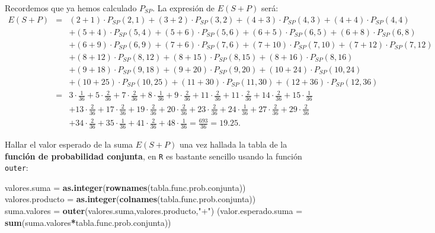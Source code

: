 \documentclass[]{book}
\newenvironment{Shaded}{\begin{snugshade}}{\end{snugshade}}
\newcommand{\DataTypeTok}[1]{\textcolor[rgb]{0.13,0.29,0.53}{#1}}
\newcommand{\KeywordTok}[1]{\textcolor[rgb]{0.13,0.29,0.53}{\textbf{#1}}}
\newcommand{\NormalTok}[1]{#1}
\newcommand{\OperatorTok}[1]{\textcolor[rgb]{0.81,0.36,0.00}{\textbf{#1}}}
\newcommand{\StringTok}[1]{\textcolor[rgb]{0.31,0.60,0.02}{#1}}
\begin{document}
Recordemos que ya hemos calculado \(P_{SP}\). La expresión de \(E(S+P)\) será:
\[
\begin{array}{rll}
E(S+P) & = &(2+1)\cdot P_{SP}(2,1)+(3+2)\cdot P_{SP}(3,2)+(4+3)\cdot P_{SP}(4,3)+(4+4)\cdot P_{SP}(4,4)\\ & &
+ (5+4)\cdot P_{SP}(5,4)+(5+6)\cdot P_{SP}(5,6)+(6+5)\cdot P_{SP}(6,5)+(6+8)\cdot P_{SP}(6,8)\\ & & 
+ (6+9)\cdot P_{SP}(6,9)+(7+6)\cdot P_{SP}(7,6)+(7+10)\cdot P_{SP}(7,10)+(7+12)\cdot P_{SP}(7,12)\\ & & 
+ (8+12)\cdot P_{SP}(8,12)+(8+15)\cdot P_{SP}(8,15)+(8+16)\cdot P_{SP}(8,16)\\ & & +(9+18)\cdot P_{SP}(9,18)
+ (9+20)\cdot P_{SP}(9,20)+(10+24)\cdot P_{SP}(10,24)\\ & & +(10+25)\cdot P_{SP}(10,25)+(11+30)\cdot P_{SP}(11,30) 
+ (12+36)\cdot P_{SP}(12,36) \\ & = & 3\cdot \frac{1}{36}+5\cdot\frac{2}{36}+7\cdot \frac{2}{36}+8\cdot \frac{1}{36}+9\cdot \frac{2}{36}+11\cdot\frac{2}{36}+11\cdot \frac{2}{36}+14\cdot\frac{2}{36}+15\cdot\frac{1}{36}\\ & & 
+ 13\cdot\frac{2}{36}+17\cdot\frac{2}{36}+19\cdot\frac{2}{36}+20\cdot\frac{2}{36}+23\cdot\frac{2}{36}+24\cdot\frac{1}{36}+27\cdot\frac{2}{36}+29\cdot\frac{2}{36} \\ & & 
+ 34\cdot\frac{2}{36}+35\cdot\frac{1}{36}+41\cdot\frac{2}{36}+48\cdot\frac{1}{36}=\frac{693}{36}= 19.25.
\end{array}
\]

Hallar el valor esperado de la suma \(E(S+P)\) una vez hallada la tabla de la \textbf{función de probabilidad conjunta}, en \texttt{R} es bastante sencillo usando la función \texttt{outer}:

\begin{Shaded}
\begin{Highlighting}[]
\NormalTok{valores.suma =}\StringTok{ }\KeywordTok{as.integer}\NormalTok{(}\KeywordTok{rownames}\NormalTok{(tabla.func.prob.conjunta))}
\NormalTok{valores.producto =}\StringTok{ }\KeywordTok{as.integer}\NormalTok{(}\KeywordTok{colnames}\NormalTok{(tabla.func.prob.conjunta))}
\NormalTok{suma.valores =}\StringTok{ }\KeywordTok{outer}\NormalTok{(valores.suma,valores.producto,}\StringTok{"+"}\NormalTok{)}
\NormalTok{(}\DataTypeTok{valor.esperado.suma =} \KeywordTok{sum}\NormalTok{(suma.valores}\OperatorTok{*}\NormalTok{tabla.func.prob.conjunta))}
\end{Highlighting}
\end{Shaded}
\end{document}
